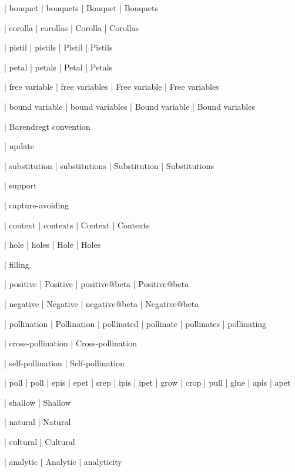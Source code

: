  | bouquet
 | bouquets
 | Bouquet
 | Bouquets

 | corolla
 | corollas
 | Corolla
 | Corollas

 | pistil
 | pistils
 | Pistil
 | Pistils

 | petal
 | petals
 | Petal
 | Petals

 | free variable
 | free variables
 | Free variable
 | Free variables

 | bound variable
 | bound variables
 | Bound variable
 | Bound variables

 | Barendregt convention

 | update

 | substitution
 | substitutions
 | Substitution
 | Substitutions

 | support

 | capture-avoiding

 | context
 | contexts
 | Context
 | Contexts

 | hole
 | holes
 | Hole
 | Holes

 | filling

 | positive
 | Positive
 | positive@beta
 | Positive@beta

 | negative
 | Negative
 | negative@beta
 | Negative@beta

 | pollination
 | Pollination
 | pollinated
 | pollinate
 | pollinates
 | pollinating

 | cross-pollination
 | Cross-pollination

 | self-pollination
 | Self-pollination

 | poll{\da}
 | poll{\ua}
 | epis
 | epet
 | srep
 | ipis
 | ipet
 | grow
 | crop
 | pull
 | glue
 | apis
 | apet

 | shallow
 | Shallow

 | natural
 | Natural

 | cultural
 | Cultural

 | analytic
 | Analytic
 | analyticity

